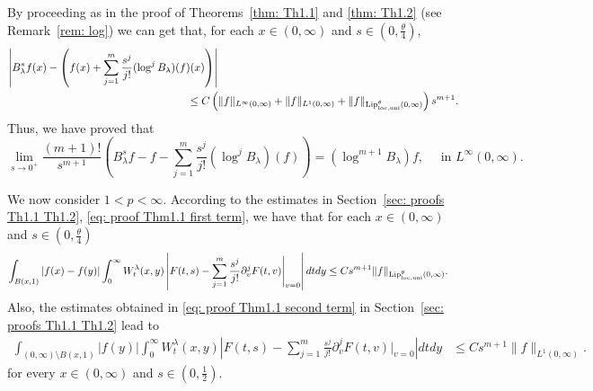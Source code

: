 \documentclass[a4paper,10pt, reqno]{amsart}
\theoremstyle{definition}
\theoremstyle{remark}
\numberwithin{equation}{section}
\begin{document}
By proceeding as in the proof of Theorems~\ref{thm: Th1.1} and \ref{thm: Th1.2} (see Remark~\ref{rem: log}) we can get that, for each $x\in (0,\infty)$ and $s\in (0,\tfrac{\theta}{4})$,
\begin{align*}
    \left|B_\lambda^sf(x)-\left(f(x)+\sum_{j=1}^m\frac{s^j}{j!}(\log^jB_\lambda)(f)(x)\right)\right|&\\
    &\hspace{-1cm}\leq C\left(\|f\|_{L^\infty (0,\infty)}+\|f\|_{L^1(0,\infty)}+\|f\|_{{\textup{Lip}}^\theta_{{\rm loc}, {\rm uni}}(0,\infty)}\right)s^{m+1}.
\end{align*}
Thus, we have proved that
\[
\lim_{s\rightarrow 0^+}\frac{(m+1)!}{s^{m+1}}\left(B_\lambda^sf-f-\sum_{j=1}^m\frac{s^j}{j!}(\log^jB_\lambda)(f)\right)=(\log^{m+1}B_\lambda)f,\quad \mbox{ in }L^\infty (0,\infty).
\]

We now consider $1<p<\infty$. According to the estimates in Section~\ref{sec: proofs Th1.1 Th1.2}, \eqref{eq: proof Thm1.1 first term}, we have that for each $x\in (0,\infty)$ and $s\in (0,\tfrac{\theta}{4})$
\begin{align}\label{4.0}
    \int_{B(x,1)}|f(x)-f(y)|\int_0^\infty W_t^\lambda (x,y)\left|F(t,s)-\sum_{j=1}^m\frac{s^j}{j!}\partial_v^jF(t,v)\Bigg|_{v=0}\right|dtdy&\leq Cs^{m+1}\|f\|_{{\textup{Lip}}^\theta _{{\rm loc},{\rm uni}}(0,\infty)}.
\end{align}
Also, the estimates obtained in \eqref{eq: proof Thm1.1 second term} in Section~\ref{sec: proofs Th1.1 Th1.2} lead to
\begin{align}\label{F}
    \int_{(0,\infty)\setminus B(x,1)}|f(y)|\int_0^\infty W_t^\lambda (x,y)\left|F(t,s)-\sum_{j=1}^m\frac{s^j}{j!}\partial_v^jF(t,v)\Bigg|_{v=0}\right|dtdy&\leq Cs^{m+1}\|f\|_{L^1(0,\infty)}.
\end{align}
for every $x\in (0,\infty)$ and $s\in (0,\tfrac12)$.
\end{document}

